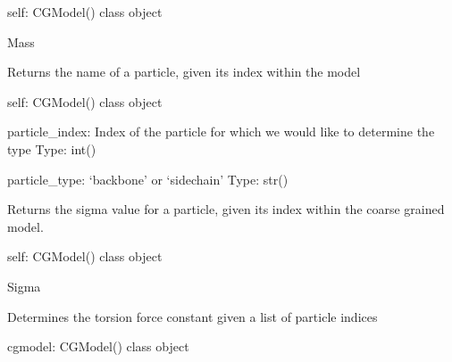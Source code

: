 \documentclass[letterpaper,12pt,english,openany,oneside]{sphinxmanual}
\begin{document}
\begin{fulllineitems}
\begin{fulllineitems}
self: CGModel() class object

Mass

\end{fulllineitems}


\begin{fulllineitems}
\label{\detokenize{cg_model:cg_model.cgmodel.CGModel.get_particle_type}}
Returns the name of a particle, given its index within the model

self: CGModel() class object

particle\_index: Index of the particle for which we would like to determine the type
Type: int()

particle\_type: ‘backbone’ or ‘sidechain’
Type: str()

\end{fulllineitems}


\begin{fulllineitems}
\label{\detokenize{cg_model:cg_model.cgmodel.CGModel.get_sigma}}
Returns the sigma value for a particle, given its index within the coarse grained model.

self: CGModel() class object

Sigma

\end{fulllineitems}


\begin{fulllineitems}
\label{\detokenize{cg_model:cg_model.cgmodel.CGModel.get_torsion_force_constant}}
Determines the torsion force constant given a list of particle indices

cgmodel: CGModel() class object


\end{fulllineitems}
\end{fulllineitems}
\end{document}
